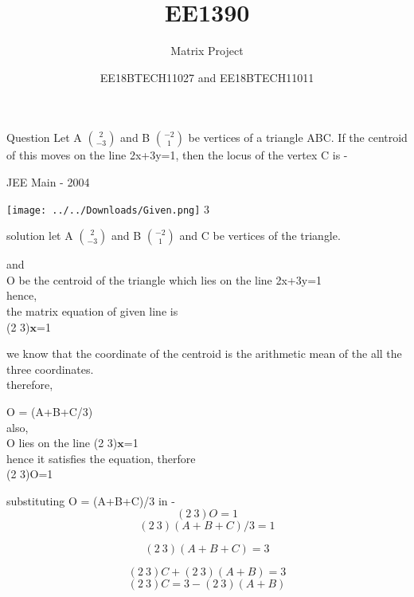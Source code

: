 \documentclass{beamer}
\title[]{EE1390}
\subtitle{Matrix Project}
\author{EE18BTECH11027 and EE18BTECH11011}
\date{}
\begin{document}
\begin{frame}
\titlepage
\end{frame}

\begin{frame}{Question}
Let A $\binom{2}{-3}$ and B $\binom{-2}{1}$ be vertices of a triangle ABC. If the centroid of this moves on the line 2x+3y=1, then the locus of the vertex  C is -

\setlength{\parindent}{4cm}
JEE Main - 2004
\end{frame}

\begin{frame}
{\texttt{[image: ../../Downloads/Given.png]} 3}
\end{frame}

\begin{frame}{solution}
let A $\binom{2}{-3}$ and B $\binom{-2}{1}$ and C be vertices of the triangle.

and  \\ O be the centroid of the triangle which lies on the line 2x+3y=1 \\ 
  hence, \\ the matrix equation of given line is
  \setlength{\parindent}{4cm}
  \\(2  3)$\boldsymbol{x}$=1
\end{frame}

\begin{frame}
we know that the coordinate of the centroid is the arithmetic mean of the all the three coordinates. \\ therefore,

O = (A+B+C/3)
\\also, \\O lies on the line (2 3)$\boldsymbol{x}$=1
\\hence it satisfies the equation, therfore\\
(2   3)O=1

\end{frame}

\begin{frame}
substituting O = (A+B+C)/3  in - \\
\begin{equation}
 (2\ 3)O=1
\end{equation}
\begin{equation}
(2 \ 3)(A+B+C)/3 = 1
\end{equation}
 
\begin{equation}
(2 \  3)(A+B+C) = 3
\end{equation}
 
\begin{equation}
(2 \  3)C + (2 \ 3)(A+B) = 3 
\end{equation}
\begin{equation}
(2  \ 3)C = 3 - (2\ 3)(A+B)
\end{equation}
\end{frame}
\end{document}
